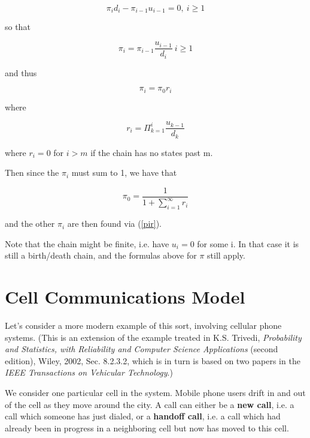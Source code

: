 \begin{equation}
\pi_i d_i - \pi_{i-1} u_{i-1} = 0,
~ i \geq 1
\end{equation}

so that 

\begin{equation}
\pi_i = \pi_{i-1} \frac{u_{i-1}}{d_i}
~ i \geq 1
\end{equation}

and thus

\begin{equation}
\label{pir}
\pi_i = \pi_0 r_i
\end{equation}

where

\begin{equation}
r_{i}=\Pi ^{i}_{k=1}\frac{u_{k-1}}{d_k}
\end{equation}

where $r_i = 0$ for $i > m$ if the chain has no states past m.

Then since the $\pi_i$ must sum to 1, we have that

\begin{equation}
\pi_{0}=\frac{1}{1+\sum ^{\infty }_{i=1}r_{i}}
\end{equation}  

and the other $\pi_i$ are then found via (\ref{pir}).  

Note that the chain might be finite, i.e. have $u_i = 0$ for some i.  In
that case it is still a birth/death chain, and the formulas above for
$\pi$ still apply.

\section{Cell Communications Model}

Let's consider a more modern example of this sort, involving cellular
phone systems.  (This is an extension of the example treated in K.S.
Trivedi, {\it Probability and Statistics, with Reliability and Computer
Science Applications} (second edition), Wiley, 2002, Sec. 8.2.3.2, which
is in turn is based on two papers in the {\it IEEE Transactions on
Vehicular Technology}.)

We consider one particular cell in the system.  Mobile phone users drift
in and out of the cell as they move around the city.  A call can either
be a {\bf new call}, i.e. a call which someone has just dialed, or a
{\bf handoff call}, i.e. a call which had already been in progress in a
neighboring cell but now has moved to this cell.

